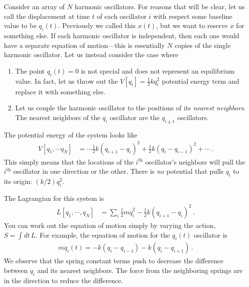 \documentclass[12pt, oneside]{report}    %
\begin{document}
Consider an array of $N$ harmonic oscillators. For reasons that will be clear, let us call the displacement at time $t$ of each oscillator $i$ with respect some baseline value to be $q_i(t)$. Previously we called this $x(t)$, but we want to reserve $x$ for something else. If each harmonic oscillator is independent, then each one would have a separate equation of motion---this is essentially $N$ copies of the single harmonic oscillator. Let us instead consider the case where
\begin{enumerate}
    \item The point $q_i(t)=0$ is not special and does not represent an equilibrium value. In fact, let us throw out the $V[q_i]=\frac{1}{2}kq_i^2$ potential energy term and replace it with something else.
    \item Let us couple the harmonic oscillator to the positions of its \emph{nearest neighbors}. The nearest neighbors of the $q_i$ oscillator are the $q_{i\pm 1}$ oscillators. 
\end{enumerate}
The potential energy of the system looks like
\begin{align}
    V[q_1,\cdots q_N] &=
    \cdots
    \frac{1}{2}k(q_{i+1}-q_i)^2 +
    \frac{1}{2}k(q_{i}-q_{i-1})^2 +
    \cdots \ .
\end{align}
This simply means that the locations of the $i^\text{th}$ oscillator's neighbors will pull the $i^{\text{th}}$ oscillator in one direction or the other. There is \emph{no} potential that pulls $q_i$ to its origin: $(k/2)q_i^2$. 


The Lagrangian  for this system is
\begin{align}
    L[q_1,\cdots, q_N]
    &= 
    \sum_i \frac{1}{2} m \dot q_i^2 - \frac{1}{2}k (q_{i+1}-q_i)^2 \ .
\end{align}
You can work out the equation of motion simply by varying the action, $S=\int dt\,L$. For example, the equation of motion for the $q_i(t)$ oscillator is
\begin{align}
    m\ddot{q}_i(t) = -k(q_{i}-q_{i-1}) -k(q_{i}-q_{i+1}) \ .
\end{align}
We observe that the spring constant terms push to decrease the difference between $q_i$ and its nearest neighbors. The force from the neighboring springs are in the direction to reduce the difference.

\end{document}
